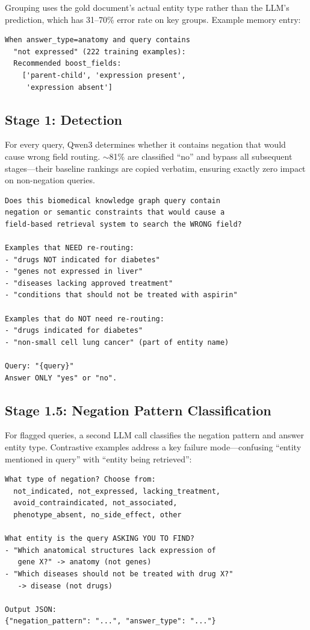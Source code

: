 \documentclass[11pt]{article}
\begin{document}
Grouping uses the gold document's actual entity type rather than the LLM's prediction, which has 31--70\% error rate on key groups. Example memory entry:
\begin{lstlisting}
When answer_type=anatomy and query contains
  "not expressed" (222 training examples):
  Recommended boost_fields:
    ['parent-child', 'expression present',
     'expression absent']
\end{lstlisting}

\subsection{Stage 1: Detection}

For every query, Qwen3 determines whether it contains negation that would cause wrong field routing. $\sim$81\% are classified ``no'' and bypass all subsequent stages---their baseline rankings are copied verbatim, ensuring exactly zero impact on non-negation queries.

\begin{lstlisting}
Does this biomedical knowledge graph query contain
negation or semantic constraints that would cause a
field-based retrieval system to search the WRONG field?

Examples that NEED re-routing:
- "drugs NOT indicated for diabetes"
- "genes not expressed in liver"
- "diseases lacking approved treatment"
- "conditions that should not be treated with aspirin"

Examples that do NOT need re-routing:
- "drugs indicated for diabetes"
- "non-small cell lung cancer" (part of entity name)

Query: "{query}"
Answer ONLY "yes" or "no".
\end{lstlisting}

\subsection{Stage 1.5: Negation Pattern Classification}

For flagged queries, a second LLM call classifies the negation pattern and answer entity type. Contrastive examples address a key failure mode---confusing ``entity mentioned in query'' with ``entity being retrieved'':

\begin{lstlisting}
What type of negation? Choose from:
  not_indicated, not_expressed, lacking_treatment,
  avoid_contraindicated, not_associated,
  phenotype_absent, no_side_effect, other

What entity is the query ASKING YOU TO FIND?
- "Which anatomical structures lack expression of
   gene X?" -> anatomy (not genes)
- "Which diseases should not be treated with drug X?"
   -> disease (not drugs)

Output JSON:
{"negation_pattern": "...", "answer_type": "..."}
\end{lstlisting}
\end{document}
